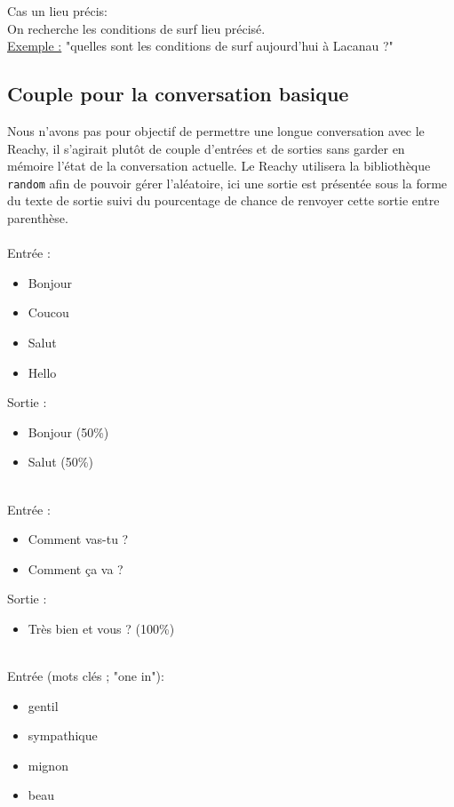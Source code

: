 Cas un lieu précis: \\
On recherche les conditions de surf lieu précisé. \\
\underline{Exemple :} "quelles sont les conditions de surf aujourd'hui à Lacanau ?" \\

\subsection{Couple pour la conversation basique} \label{subsec_couples_conv}
Nous n'avons pas pour objectif de permettre une longue conversation avec le Reachy,  il s'agirait plutôt de couple d'entrées et de sorties sans garder en mémoire l'état de la conversation actuelle. Le Reachy utilisera la bibliothèque \texttt{random} afin de pouvoir gérer l'aléatoire, ici une sortie est présentée sous la forme du texte de sortie suivi du pourcentage de chance de renvoyer cette sortie entre parenthèse.\\
\ \\
Entrée :
\begin{itemize}
    \item Bonjour 
    \item Coucou
    \item Salut
    \item Hello
\end{itemize}
Sortie : \\
\begin{itemize}
    \item Bonjour (50\%)
    \item Salut (50\%)
\end{itemize}
\ \\
Entrée :
\begin{itemize}
    \item Comment vas-tu ?
    \item Comment ça va ?
\end{itemize}
Sortie :
\begin{itemize}
    \item Très bien et vous ? (100\%)
\end{itemize}
\ \\
Entrée (mots clés ; {\color{red}"one in"}): 
\begin{itemize}
    \item gentil
    \item sympathique
    \item mignon
    \item beau
\end{itemize}
